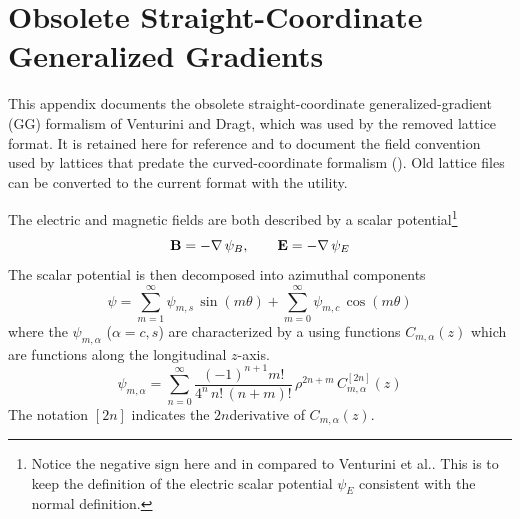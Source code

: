 \chapter{Obsolete Straight-Coordinate Generalized Gradients}
\label{s:gen.grad.old}

This appendix documents the obsolete straight-coordinate generalized-gradient (GG) formalism of
Venturini and Dragt\cite{b:gen.grad}, which was used by the removed  lattice
format. It is retained here for reference and to document the field convention used by lattices that
predate the curved-coordinate formalism (). Old  lattice
files can be converted to the current  format with the
 utility.

The electric and magnetic fields are both described by a scalar potential\footnote
  {
Notice the negative sign here and in  compared to Venturini et al.\cite{b:gen.grad}. This
is to keep the definition of the electric scalar potential $\psi_E$ consistent with the normal
definition.
  }
\begin{equation}
  {\bf B} = -\nabla \, \psi_B, \qquad {\bf E} = -\nabla \, \psi_E
  \label{bpep2}
\end{equation}
The scalar potential is then decomposed into azimuthal components
\begin{equation}
  \psi = \sum_{m = 1}^\infty \psi_{m,s} \, \sin(m \theta) + \sum_{m = 0}^\infty \psi_{m,c} \, \cos(m \theta)
\end{equation}
where the $\psi_{m,\alpha}$ ($\alpha = c,s$) are characterized by a using functions
$C_{m,\alpha}(z)$ which are functions along the longitudinal $z$-axis.
\begin{equation}
  \psi_{m,\alpha} = \sum_{n = 0}^\infty \frac{(-1)^{n+1} m!}{4^n \, n! \, (n+m)!} 
  \, \rho^{2n+m} \, C_{m,\alpha}^{[2n]}(z) 
  \label{ppmpp}
\end{equation}
The notation $[2n]$ indicates the $2n$\Th derivative of $C_{m,\alpha}(z)$.

